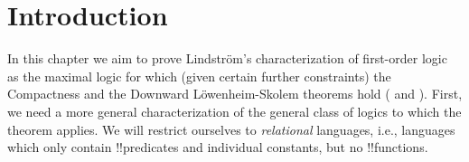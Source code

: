 \documentclass[../../include/open-logic-section]{subfiles}
\begin{document}
\section{Introduction}

In this chapter we aim to prove Lindstr\"om's characterization of
first-order logic as the maximal logic for which (given certain
further constraints) the Compactness and the Downward
L\"owenheim-Skolem theorems hold
( and
). First, we need a more general
characterization of the general class of logics to which the theorem
applies. We will restrict ourselves to \emph{relational} languages,
i.e., languages which only contain !!{predicate}s and individual
constants, but no !!{function}s.
\end{document}
